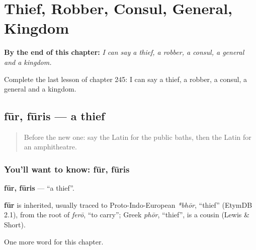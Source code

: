 
\chapter{Thief, Robber, Consul, General, Kingdom}
\label{ch:la-thief-robber-consul-general-kingdom}

\begin{chapteropening}
\textbf{By the end of this chapter:} \emph{I can say a thief, a robber, a consul, a general and a kingdom.}

Complete the last lesson of chapter 245: I can say a thief, a robber, a consul, a general and a kingdom.
\end{chapteropening}

\section[fūr, fūris]{fūr, fūris — a thief}

\label{lesson:LA-C245-fur}



\begin{quote}
Before the new one: say the Latin for the public baths, then the Latin for an amphitheatre.
\end{quote}

\subsection*{You'll want to know: fūr, fūris}
\textbf{fūr, fūris} — \textquotedblleft{}a thief\textquotedblright{}.

\begin{cousinweb}
\textbf{fūr} is inherited, usually traced to Proto-Indo-European \emph{*bhōr}, \textquotedblleft{}thief\textquotedblright{} (EtymDB 2.1), from the root of \emph{ferō}, \textquotedblleft{}to carry\textquotedblright{}; Greek \emph{phōr}, \textquotedblleft{}thief\textquotedblright{}, is a cousin (Lewis \& Short).
\end{cousinweb}

\begin{grammarlens}[title={What you've built}]
One more word for this chapter.
\end{grammarlens}

